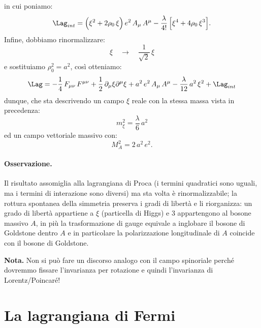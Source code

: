 in cui poniamo:
\begin{equation}
    \Lag_{int} = \Big( \xi^2 + 2\rho_0\, \xi \Big)\, e^2\, A_\mu\, A^\mu - \frac{\lambda}{4!}\, \Big[ \xi^4 + 4\rho_0\, \xi^3 \Big].
\end{equation}
Infine, dobbiamo rinormalizzare:
\begin{equation}
    \xi \quad \longrightarrow \quad \frac{1}{\sqrt{2}}\, \xi
\end{equation}
e sostituiamo $\rho_0^2 = a^2$, così otteniamo:
\begin{equation}
    \Lag = -\frac{1}{4}\, F_{\mu\nu}\, F^{\mu\nu} + \frac{1}{2}\, \partial_\mu\xi\partial^\mu\xi + a^2\, e^2\, A_\mu\, A^\mu - \frac{\lambda}{12}\, a^2\, \xi^2 + \Lag_{int}
\end{equation}
dunque, che sta descrivendo un campo $\xi$ reale con la stessa massa vista in precedenza:
\begin{equation}
    m_\xi^2 = \frac{\lambda}{6}\, a^2
\end{equation}
ed un campo vettoriale massivo con:
\begin{equation}
    M_A^2 = 2\, a^2\, e^2.
\end{equation}

\paragraph{Osservazione.}Il risultato assomiglia alla lagrangiana di Proca (i termini quadratici sono uguali, ma i termini di interazione sono diversi) ma sta volta è rinormalizzabile; la rottura spontanea della simmetria preserva i gradi di libertà e li riorganizza: un grado di libertà appartiene a $\xi$ (particella di Higgs) e 3 appartengono al bosone massivo $A$, in più la trasformazione di gauge equivale a inglobare il bosone di Goldstone dentro $A$ e in particolare la polarizzazione longitudinale di $A$ coincide con il bosone di Goldstone.

\textbf{Nota.} Non si può fare un discorso analogo con il campo spinoriale perché dovremmo fissare l'invarianza per rotazione e quindi l'invarianza di Lorentz/Poincaré!


\section{La lagrangiana di Fermi}

